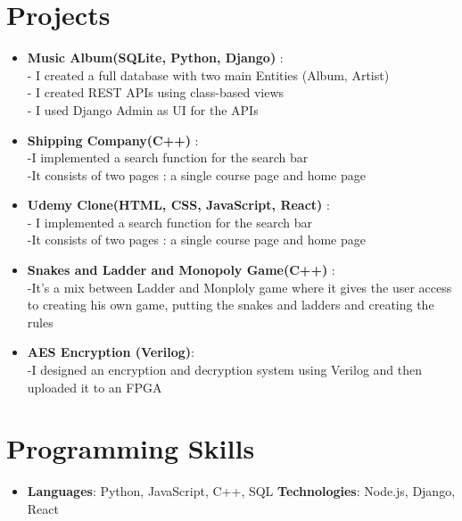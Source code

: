 \documentclass[letterpaper,11pt]{article}
\newcommand{\resumeItem}[2]{
  \item\small{
    \textbf{#1}{: #2 \vspace{-2pt}}
  }
}
\newcommand{\resumeSubItem}[2]{\resumeItem{#1}{#2}\vspace{-4pt}}
\newcommand{\resumeSubHeadingListStart}{\begin{itemize}[leftmargin=*]}
\newcommand{\resumeSubHeadingListEnd}{\end{itemize}}
\begin{document}
\section{Projects}
  \resumeSubHeadingListStart
    \resumeSubItem{Music Album(SQLite, Python, Django) 
}
      {    \\ 
- I created a full database with two main Entities (Album, Artist) \\
- I created REST APIs using class-based views   \\
- I used Django Admin as UI for the APIs  
}
    \resumeSubItem{Shipping Company(C++)
}
      {\\-I implemented a search function for the search bar 
\\-It consists of two pages : a single course page and home page
}
    \resumeSubItem{Udemy Clone(HTML, CSS, JavaScript, React) 
}
      { \\- I implemented a search function for the search bar 
\\-It consists of two pages : a single course page and home page
}
    \resumeSubItem{Snakes and Ladder and Monopoly Game(C++)
}
      {\\-It’s a mix between Ladder and Monploly game where it gives the user access to creating his own game, putting the snakes and ladders and creating the rules  }
          \resumeSubItem{AES Encryption (Verilog)}
      {\\-I designed an encryption and decryption system using Verilog and then uploaded it to an FPGA 
}
  \resumeSubHeadingListEnd

%
\section{Programming Skills}
 \resumeSubHeadingListStart
   \item{
     \textbf{Languages}{: Python, JavaScript, C++, SQL}
     \hfill
     \textbf{Technologies}{: Node.js, Django, React}
   }
 \resumeSubHeadingListEnd


\end{document}
